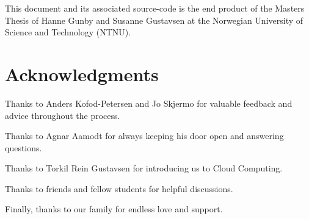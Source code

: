 
This document and its associated source-code is the end product of the Masters Thesis of Hanne Gunby and Susanne Gustavsen at the Norwegian University of Science and Technology (NTNU). 


\section*{Acknowledgments}

Thanks to Anders Kofod-Petersen and Jo Skjermo for valuable feedback and advice throughout the process.

Thanks to Agnar Aamodt for always keeping his door open and answering questions.

Thanks to Torkil Rein Gustavsen for introducing us to Cloud Computing.

Thanks to friends and fellow students for helpful discussions.

Finally, thanks to our family for endless love and support.